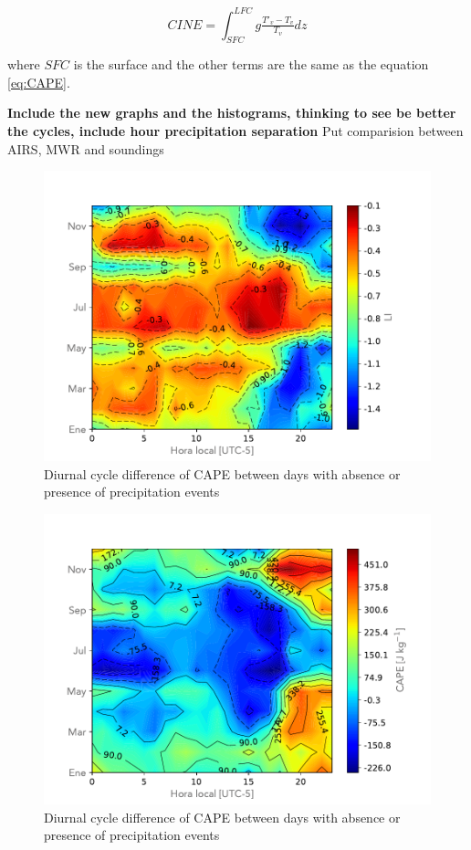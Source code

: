 \documentclass{ametsoc}
\begin{document}
\begin{equation}
CINE = \int_{SFC}^{LFC}g\tfrac{T'_v-T_v}{T_v}dz
\label{eq:CINE}
\end{equation}

where $SFC$ is the surface and the other terms are the same as the equation \ref{eq:CAPE}.


\textbf{Include the new graphs and the histograms, thinking to see be better the cycles, include hour precipitation separation}
Put comparision between AIRS, MWR and soundings
\begin{figure}[h!]
\centering
\includegraphics[width=1.0\linewidth]{Figuras/LI_Matrix_resta.pdf}
\caption{Diurnal cycle difference of CAPE between days with absence or presence of precipitation events }
\label{fig:LIdifference}
\end{figure}


\begin{figure}[h!]
\centering
\includegraphics[width=1.0\linewidth]{Figuras/CAPE_Matrix_resta.pdf}
\caption{Diurnal cycle difference of CAPE between days with absence or presence of precipitation events }
\label{fig:CAPEdifference}
\end{figure}
\end{document}
